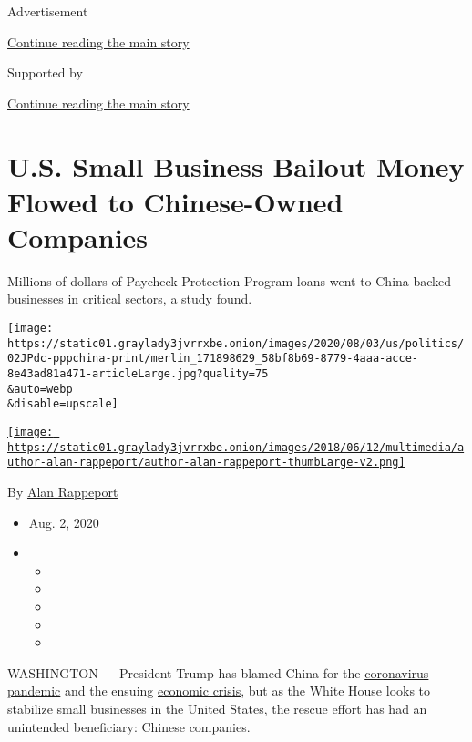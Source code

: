 Advertisement

\protect\hyperlink{after-top}{Continue reading the main story}

Supported by

\protect\hyperlink{after-sponsor}{Continue reading the main story}

\hypertarget{us-small-business-bailout-money-flowed-to-chinese-owned-companies}{%
\section{U.S. Small Business Bailout Money Flowed to Chinese-Owned
Companies}\label{us-small-business-bailout-money-flowed-to-chinese-owned-companies}}

Millions of dollars of Paycheck Protection Program loans went to
China-backed businesses in critical sectors, a study found.

\texttt{[image: https://static01.graylady3jvrrxbe.onion/images/2020/08/03/us/politics/02JPdc-pppchina-print/merlin\_171898629\_58bf8b69-8779-4aaa-acce-8e43ad81a471-articleLarge.jpg?quality=75\\\&auto=webp\\\&disable=upscale]}

\href{https://www.nytimes3xbfgragh.onion/by/alan-rappeport}{\texttt{[image: https://static01.graylady3jvrrxbe.onion/images/2018/06/12/multimedia/author-alan-rappeport/author-alan-rappeport-thumbLarge-v2.png]}}

By \href{https://www.nytimes3xbfgragh.onion/by/alan-rappeport}{Alan
Rappeport}

\begin{itemize}
\item
  Aug. 2, 2020
\item
  \begin{itemize}
  \item
  \item
  \item
  \item
  \item
  \end{itemize}
\end{itemize}

WASHINGTON --- President Trump has blamed China for the
\href{https://www.nytimes3xbfgragh.onion/news-event/coronavirus}{coronavirus
pandemic} and the ensuing
\href{https://www.nytimes3xbfgragh.onion/2020/07/30/business/economy/q2-gdp-coronavirus-economy.html}{economic
crisis}, but as the White House looks to stabilize small businesses in
the United States, the rescue effort has had an unintended beneficiary:
Chinese companies.

